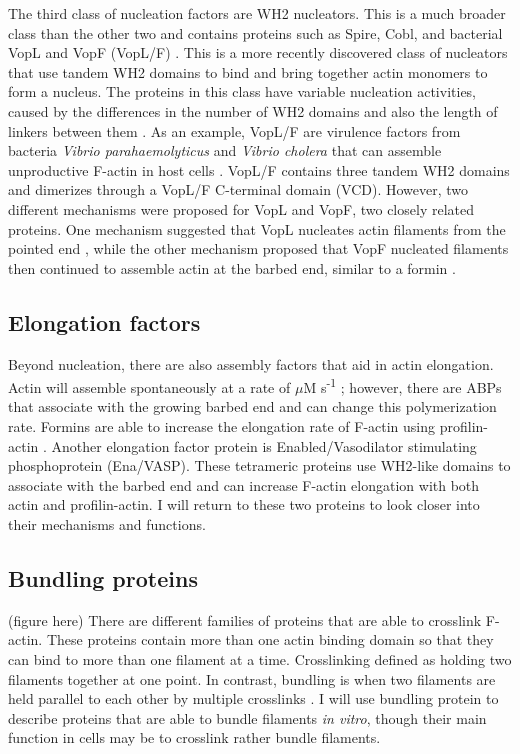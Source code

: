 The third class of nucleation factors are WH2 nucleators. This is a much broader class than the other two and contains proteins such as Spire, Cobl, and bacterial VopL and VopF (VopL/F) \citep{quinlan_drosophila_2005, namgoong_mechanism_2011, burke_bacterial_2017,siton-mendelson_functional_2017}. This is a more recently discovered class of nucleators that use tandem WH2 domains to bind and bring together actin monomers to form a nucleus. The proteins in this class have variable nucleation activities, caused by the differences in the number of WH2 domains and also the length of linkers between them \citep{siton-mendelson_functional_2017}. As an example, VopL/F are virulence factors from bacteria \textit{Vibrio parahaemolyticus} and \textit{Vibrio cholera} that can assemble unproductive F-actin in host cells \citep{liverman_arp2/3-independent_2007}. VopL/F contains three tandem WH2 domains and dimerizes through a VopL/F C-terminal domain (VCD). However, two different mechanisms were proposed for VopL and VopF, two closely related proteins. One mechanism suggested that VopL nucleates actin filaments from the pointed end \citep{namgoong_mechanism_2011,yu_mechanism_2011,zahm_bacterial_2013}, while the other mechanism proposed that VopF nucleated filaments then continued to assemble actin at the barbed end, similar to a formin \citep{pernier_dimeric_2013}.

\subsection{Elongation factors}\label{elongators}
Beyond nucleation, there are also assembly factors that aid in actin elongation. Actin will assemble spontaneously at a rate of  $\mu$M s\textsuperscript{-1} \citep{pollard_rate_1986}; however, there are ABPs that associate with the growing barbed end and can change this polymerization rate. Formins are able to increase the elongation rate of F-actin using profilin-actin \citep{pollard_actin_2016}. Another elongation factor protein is Enabled/Vasodilator stimulating phosphoprotein (Ena/VASP). These tetrameric proteins use WH2-like domains to associate with the barbed end and can increase F-actin elongation with both actin and profilin-actin. I will return to these two proteins to look closer into their mechanisms and functions.

\subsection{Bundling proteins}\label{bundlers}
(figure here)
There are different families of proteins that are able to crosslink F-actin. These proteins contain more than one actin binding domain so that they can bind to more than one filament at a time. Crosslinking defined as holding two filaments together at one point. In contrast, bundling is when two filaments are held parallel to each other by multiple crosslinks \citep{pollard_actin_2016}. I will use bundling protein to describe proteins that are able to bundle filaments \textit{in vitro}, though their main function in cells may be to crosslink rather bundle filaments. 

